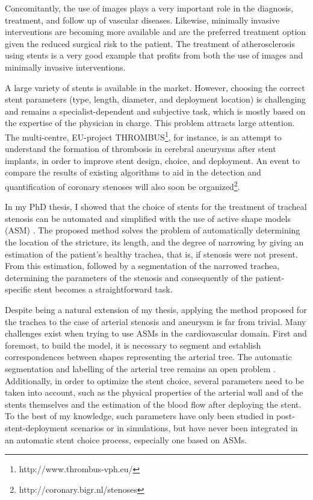 \documentclass[a4paper]{article}
\begin{document}
Concomitantly, the use of images plays a very important role in the diagnosis, treatment, and follow up of vascular diseases. Likewise, minimally invasive interventions are becoming more available and are the preferred treatment option given the reduced surgical risk to the patient. The treatment of atherosclerosis using stents is a very good example that profits from both the use of images and minimally invasive interventions. 

A large variety of stents is available in the market. However, choosing the correct stent parameters (type, length, diameter, and deployment location) is challenging and remains a specialist-dependent and subjective task, which is mostly based on the expertise of the physician in charge. This problem attracts large attention. The multi-centre, EU-project THROMBUS\footnote{http://www.thrombus-vph.eu/}, for instance, is an attempt to understand the formation of thrombosis in cerebral aneurysms after stent implants, in order to improve stent design, choice, and deployment. An event to compare the results of existing algorithms to aid in the detection and quantification of coronary stenoses will also soon be organized\footnote{http://coronary.bigr.nl/stenoses}.

In my PhD thesis, I showed that the choice of stents for the treatment of tracheal stenosis can be automated and simplified with the use of active shape models (ASM) \citep{Cootes}. The proposed method solves the problem of automatically determining the location of the stricture, its length, and the degree of narrowing by giving an estimation of the patient's healthy trachea, that is, if stenosis were not present. From this estimation, followed by a segmentation of the narrowed trachea, determining the parameters of the stenosis and consequently of the patient-specific stent becomes a straightforward task. 

Despite being a natural extension of my thesis, applying the method proposed for the trachea to the case of arterial stenosis and aneurysm is far from trivial. Many challenges exist when trying to use ASMs in the cardiovascular domain. First and foremost, to build the model, it is necessary to segment and establish correspondences between shapes representing the arterial tree. The automatic segmentation and labelling of the arterial tree remains an open problem \citep{ORKI-08}. Additionally, in order to optimize the stent choice, several parameters need to be taken into account, such as the physical properties of the arterial wall and of the stents themselves and the estimation of the blood flow after deploying the stent. To the best of my knowledge, such parameters have only been studied in post-stent-deployment scenarios or in simulations, but have never been integrated in an automatic stent choice process, especially one based on ASMs. 
\end{document}
